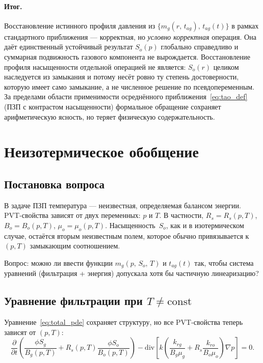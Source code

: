 ﻿\documentclass[12pt,a4paper]{article}
\begin{document}
\paragraph{Итог.}
Восстановление истинного профиля давления из
$\{m_g(r,\,t_{ag}),\,t_{ag}(t)\}$ в рамках стандартного
приближения --- корректная, но \emph{условно корректная}
операция. Она даёт единственный устойчивый результат
$S_o(p)$ глобально справедливо и суммарная
подвижность газового компонента не вырождается.
Восстановление профиля насыщенности отдельной
операцией не является: $S_o(r)$ целиком наследуется
из замыкания и потому несёт ровно ту степень
достоверности, которую имеет само замыкание,
а не численное решение по псевдопеременным.
За пределами области применимости осреднённого
приближения~\eqref{eq:tao_def} (ПЗП с контрастом
насыщенности) формальное обращение сохраняет
арифметическую ясность, но теряет физическую
содержательность.


\section{Неизотермическое обобщение}\label{sec:noniso}

\subsection{Постановка вопроса}\label{ssec:question}

В задаче ПЗП температура --- неизвестная, определяемая балансом
энергии. PVT-свойства зависят от двух переменных: $p$ и $T$.
В частности, $R_s = R_s(p,T)$, $B_o = B_o(p,T)$, $\mu_o = \mu_o(p,T)$.
Насыщенность~$S_o$, как и в изотермическом случае, остаётся
вторым неизвестным полем, которое обычно привязывается к~$(p,T)$
замыкающим соотношением.

Вопрос: можно ли ввести функции $m_g(p,\,S_o,\,T)$ и $t_{ag}(t)$ так, чтобы
система уравнений (фильтрация + энергия) допускала хотя бы частичную
линеаризацию?

\subsection{Уравнение фильтрации при $T \neq \mathrm{const}$}
\label{ssec:filt_T}

Уравнение~\eqref{eq:total_pde} сохраняет структуру, но все
PVT-свойства теперь зависят от $(p,T)$:
\begin{equation}\label{eq:oil_pde_T}
  \frac{\partial}{\partial t}\left(\frac{\phi S_g}{B_g(p,T)}
  + R_s(p,T)\frac{\phi S_o}{B_o(p,T)}\right)
  - \mathrm{div}\left[k\left(\frac{k_{rg}}{B_g\mu_g}
  + R_s\frac{k_{ro}}{B_o\mu_o}\right)\nabla p\right] = 0.
\end{equation}
\end{document}
